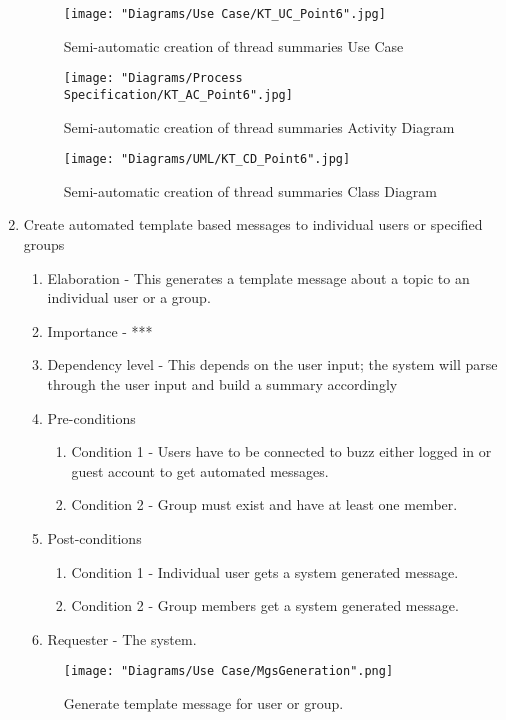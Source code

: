 \documentclass[12pt]{article}
\begin{document}
\begin{enumerate}
\begin{figure}[h]
	\texttt{[image: "Diagrams/Use Case/KT\_UC\_Point6".jpg]}
	\caption{Semi-automatic creation of thread summaries Use Case}
\end{figure}
\begin{figure}[h]
	\centering
	\texttt{[image: "Diagrams/Process Specification/KT\_AC\_Point6".jpg]}
	\caption{Semi-automatic creation of thread summaries Activity Diagram}
\end{figure}
\begin{figure}[h]
	\centering
	\texttt{[image: "Diagrams/UML/KT\_CD\_Point6".jpg]}
	\caption{Semi-automatic creation of thread summaries Class Diagram}
\end{figure}
\clearpage %
   \item Create automated template based messages to individual users or specified groups   %
  \begin{enumerate}
    \item Elaboration - This generates a template message about a topic to an individual user or a group.
    \item Importance - ***
    \item Dependency level - This depends on the user input; the system will parse through the user input and build a summary accordingly
    \item Pre-conditions
    \begin{enumerate}
 		\item Condition 1 - Users have to be connected to buzz either logged in or guest account to get automated messages.
    	\item Condition 2 - Group must exist and have at least one member.
    \end{enumerate}
        \item Post-conditions
    \begin{enumerate}
    	\item Condition 1 - Individual user gets a system generated message.
    	\item Condition 2 - Group members get a system generated message.
    \end{enumerate}
    \item Requester - The system.
  \end{enumerate}
	\begin{figure}[h]
    	\centering
    	\texttt{[image: "Diagrams/Use Case/MgsGeneration".png]}
    	\caption{Generate template message for user or group.}
    \end{figure}

\end{enumerate}
\end{document}
